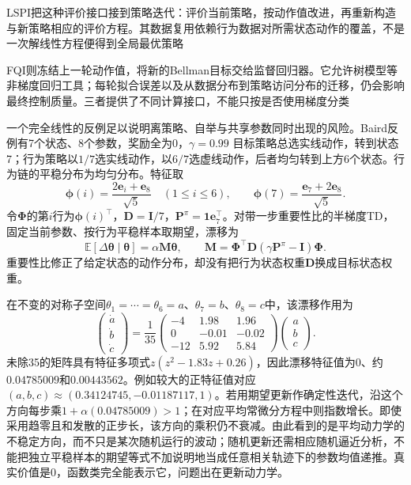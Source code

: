 LSPI把这种评价接口接到策略迭代：评价当前策略，按动作值改进，再重新构造与新策略相应的评价方程。其数据复用依赖行为数据对所需状态动作的覆盖，不是一次解线性方程便得到全局最优策略

FQI则冻结上一轮动作值，将新的Bellman目标交给监督回归器。它允许树模型等非梯度回归工具；每轮拟合误差以及从数据分布到策略访问分布的迁移，仍会影响最终控制质量。三者提供了不同计算接口，不能只按是否使用梯度分类

一个完全线性的反例足以说明离策略、自举与共享参数同时出现的风险。Baird反例有7个状态、8个参数，奖励全为0，$\gamma=0.99$
目标策略总选实线动作，转到状态7；行为策略以$1/7$选实线动作，以$6/7$选虚线动作，后者均匀转到上方6个状态。行为链的平稳分布为均匀分布。特征取
\[
  \bm{\phi}(i)=\frac{2\bm{e}_i+\bm{e}_8}{\sqrt5}\quad(1\leq i\leq6),
  \qquad
  \bm{\phi}(7)=\frac{\bm{e}_7+2\bm{e}_8}{\sqrt5}.
\]
令$\bm{\Phi}$的第$i$行为$\bm{\phi}(i)^\top$，$\bm{D}=\bm{I}/7$，$\bm{P}^\pi=\bm{1}\bm{e}_7^\top$。对带一步重要性比的半梯度TD，固定当前参数、按行为平稳样本取期望，漂移为
\begin{equation}
  \mathbb E[\Delta\bm{\theta}\mid\bm{\theta}]
     =\alpha\bm{M}\bm{\theta},\qquad
  \bm{M}=\bm{\Phi}^\top\bm{D}
                   (\gamma\bm{P}^\pi-\bm{I})\bm{\Phi}.
  \label{eq:rl-learning-baird-matrix}
\end{equation}
重要性比修正了给定状态的动作分布，却没有把行为状态权重$\bm{D}$换成目标状态权重。

在不变的对称子空间$\theta_1=\cdots=\theta_6=a$、$\theta_7=b$、$\theta_8=c$中，该漂移作用为
\begin{equation}
  \begin{pmatrix}\dot a\\\dot b\\\dot c\end{pmatrix}
  =
  \frac1{35}
  \begin{pmatrix}
    -4 & 1.98 & 1.96\\
     0 & -0.01 & -0.02\\
    -12 & 5.92 & 5.84
  \end{pmatrix}
  \begin{pmatrix}a\\b\\c\end{pmatrix}.
  \label{eq:rl-learning-baird-reduced}
\end{equation}
未除35的矩阵具有特征多项式$z(z^2-1.83z+0.26)$，因此漂移特征值为$0$、约$0.04785009$和$0.00443562$。例如较大的正特征值对应$(a,b,c)\approx(0.34124745,-0.01187117,1)$。若用期望更新作确定性迭代，沿这个方向每步乘$1+\alpha(0.04785009)>1$；在对应平均常微分方程中则指数增长。即使采用趋零且和发散的正步长，该方向的乘积仍不衰减。由此看到的是平均动力学的不稳定方向，而不只是某次随机运行的波动；随机更新还需相应随机逼近分析，不能把独立平稳样本的期望等式不加说明地当成任意相关轨迹下的参数均值递推。真实价值是0，函数类完全能表示它，问题出在更新动力学。

